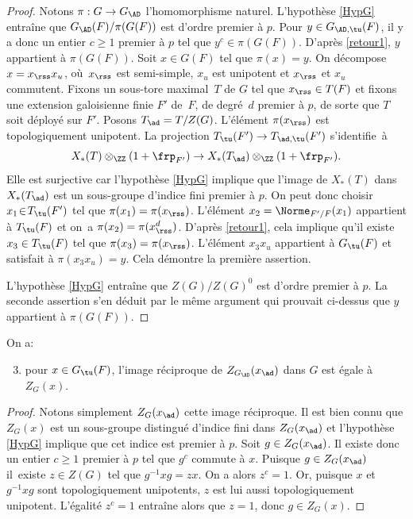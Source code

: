 \begin{proof}
Notons $\pi:G\to G_{\AD}$ l'homomorphisme naturel. L'hypothèse \ref{HypG} entraîne que $G_{\AD}(F)/\pi(G(F))$ est d'ordre premier à $p$. Pour $y\in G_{\AD,\tu}(F)$, il y a donc un entier $c\geq1$ premier à $p$ tel que $y^c\in \pi(G(F))$. D'après \eqref{retour1}, $y$ appartient à $\pi(G(F))$. Soit $x\in G(F)$ tel que $\pi(x)=y$. On décompose $x=x_{\rss}x_{u}$, où~$x_{\rss}$ est semi-simple, $x_{u}$ est unipotent et $x_{\rss}$ et $x_{u}$ commutent. Fixons un sous-tore maximal~$T$ de $G$ tel que $x_{\rss}\in T(F)$ et fixons une extension galoisienne finie $F'$ de~$F$, de degré~$d$ premier à $p$, de sorte que $T$ soit déployé sur $F'$. Posons $T_{\ad}=T/Z(G)$. L'élément $\pi(x_{\rss})$ est topologiquement unipotent. La projection $T_{\tu}(F')\to T_{\ad,\tu}(F')$ s'identifie~à
\[
X_{*}(T)\otimes_{\ZZ}(1+\frp_{F'})\to X_{*}(T_{\ad})\otimes_{\ZZ}(1+\frp_{F'}).
\]
Elle est surjective car l'hypothèse \ref{HypG} implique que l'image de $X_{*}(T)$ dans $X_{*}(T_{\ad})$ est un sous-groupe d'indice fini premier à $p$.
On peut donc choisir \hbox{$x_{1}\!\in\!T_{\tu}(F')$} tel que $\pi(x_{1})=\pi(x_{\rss})$. L'élément $x_{2}=\Norme_{F'/F}(x_{1})$ appartient à $T_{\tu}(F)$ et on~a $\pi(x_{2})=\pi(x_{\rss}^d)$. D'après \eqref{retour1}, cela implique qu'il existe $x_{3}\in T_{\tu}(F)$ tel que $\pi(x_{3})=\nobreak\pi(x_{\rss})$. L'élément $x_{3}x_{u}$ appartient à $G_{\tu}(F)$ et satisfait à $\pi(x_{3}x_{u})=y$. Cela démontre la première assertion.

L'hypothèse \ref{HypG} entraîne que $Z(G)/Z(G)^0$ est d'ordre premier à $p$. La seconde assertion s'en déduit par le même argument qui prouvait ci-dessus que $y$ appartient à $\pi(G(F))$.
\end{proof}

On a:
\begin{enumerate}\setcounter{enumi}{2}
\item\label{retour3}
pour $x\in G_{\tu}(F)$, l'image réciproque de $Z_{G_{\AD}}(x_{\ad})$ dans $G$ est égale à $Z_{G}(x)$.
\end{enumerate}

\begin{proof}
Notons simplement $Z_{G}(x_{\ad})$ cette image réciproque. Il est bien connu que $Z_{G}(x)$ est un sous-groupe distingué d'indice fini dans $Z_{G}(x_{\ad})$ et l'hypothèse \ref{HypG} implique que cet indice est premier à $p$. Soit $g\in Z_{G}(x_{\ad})$. Il existe donc un entier $c\geq1$ premier à $p$ tel que $g^c$ commute à $x$. Puisque $g\in Z_{G}(x_{\ad})$ il~existe $z\in Z(G)$ tel que $ g^{-1}xg=zx$. On a alors $z^c=1$. Or, puisque $x$ et $g^{-1}xg$ sont topologiquement unipotents, $z$ est lui aussi topologiquement unipotent. L'égalité $z^c=1$ entraîne alors que $z=1$, donc $g\in Z_{G}(x)$.
\end{proof}

